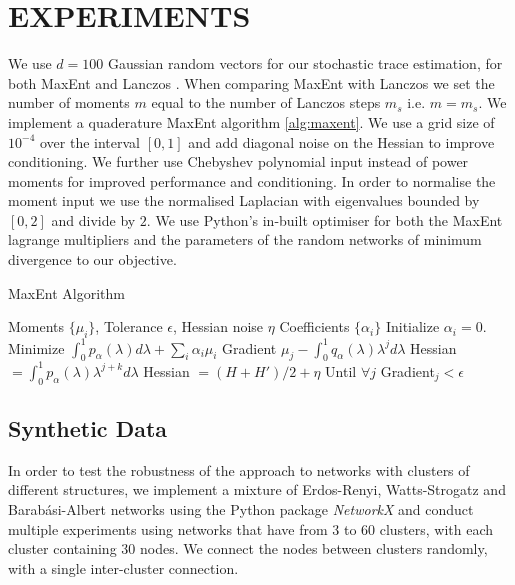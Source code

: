 \documentclass{article}
\begin{document}
\section{EXPERIMENTS}
We use $d=100$ Gaussian random vectors for our stochastic trace estimation, for both MaxEnt and Lanczos \citep{ubaru2017fast}. When comparing MaxEnt with Lanczos we set the number of moments $m$ equal to the number of Lanczos steps $m_s$ i.e. $m = m_s$. We implement a quaderature MaxEnt algorithm \ref{alg:maxent}. We use a grid size of $10^{-4}$ over the interval $[0,1]$ and add diagonal noise on the Hessian to improve conditioning. We further use Chebyshev polynomial input instead of power moments for improved performance and conditioning. In order to normalise the moment input we use the normalised Laplacian with eigenvalues bounded by $[0,2]$ and divide by $2$. We use Python's in-built optimiser for both the MaxEnt lagrange multipliers and the parameters of the random networks of minimum divergence to our objective. 
\begin{algorithm}[tb]
	\caption{MaxEnt Algorithm}
	\label{alg:maxent}
	
	\begin{algorithmic}[1]
		 Moments $\{\mu_{i}\}$, Tolerance $\epsilon$, Hessian noise $\eta$
		 Coefficients $\{\alpha_{i}\}$
		\STATE Initialize $\alpha_{i} = 0$.
		\STATE Minimize $\int_{0}^{1}p_{\alpha}(\lambda)d\lambda + \sum_{i}\alpha_{i}\mu_{i}$
		\STATE Gradient $\mu_{j}-\int_{0}^{1}q_{\alpha}(\lambda)\lambda^{j}d\lambda$
		\STATE Hessian  $ = \int_{0}^{1}p_{\alpha}(\lambda)\lambda^{j+k}d\lambda$
		\STATE Hessian $= (H+H')/2 + \eta$
		\STATE Until $\forall j$ Gradient$_{j} < \epsilon$		
	\end{algorithmic}
\end{algorithm}


\subsection{Synthetic Data}
In order to test the robustness of the approach to networks with clusters of different structures, we implement a mixture of Erdos-Renyi, Watts-Strogatz and Barabási-Albert networks using the Python package \textit{NetworkX} and conduct multiple experiments using networks that have from $3$ to $60$ clusters, with each cluster containing $30$ nodes. We connect the nodes between clusters randomly, with a single inter-cluster connection. 
\end{document}
